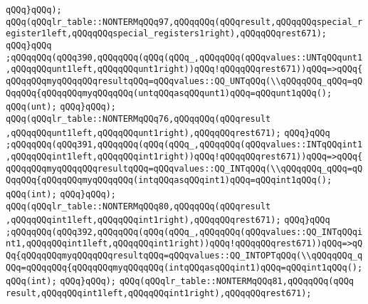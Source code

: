 \verb|qQQq}qQQq);|\newline
\verb|qQQq(qQQqlr_table::NONTERMqQQq97,qQQqqQQq(qQQqresult,qQQqqQQqspecial_register1left,qQQqqQQqspecial_registers1right),qQQqqQQqrest671);|\newline
\verb|qQQq}qQQq|\newline
\verb|;qQQqqQQq(qQQq390,qQQqqQQq(qQQq(qQQq_,qQQqqQQq(qQQqvalues::UNTqQQqunt1,qQQqqQQqunt1left,qQQqqQQqunt1right))qQQq!qQQqqQQqrest671))qQQq=>qQQq{qQQqqQQqmyqQQqqQQqresultqQQq=qQQqvalues::QQ_UNTqQQq(\\qQQqqQQq_qQQq=qQQqqQQq{qQQqqQQqmyqQQqqQQq(untqQQqasqQQqunt1)qQQq=qQQqunt1qQQq();|\newline
\verb|qQQq(unt);|\newline
\verb|qQQq}qQQq);|\newline
\verb|qQQq(qQQqlr_table::NONTERMqQQq76,qQQqqQQq(qQQqresult|\newline
\verb|,qQQqqQQqunt1left,qQQqqQQqunt1right),qQQqqQQqrest671);|\newline
\verb|qQQq}qQQq|\newline
\verb|;qQQqqQQq(qQQq391,qQQqqQQq(qQQq(qQQq_,qQQqqQQq(qQQqvalues::INTqQQqint1,qQQqqQQqint1left,qQQqqQQqint1right))qQQq!qQQqqQQqrest671))qQQq=>qQQq{qQQqqQQqmyqQQqqQQqresultqQQq=qQQqvalues::QQ_INTqQQq(\\qQQqqQQq_qQQq=qQQqqQQq{qQQqqQQqmyqQQqqQQq(intqQQqasqQQqint1)qQQq=qQQqint1qQQq();|\newline
\verb|qQQq(int);|\newline
\verb|qQQq}qQQq);|\newline
\verb|qQQq(qQQqlr_table::NONTERMqQQq80,qQQqqQQq(qQQqresult|\newline
\verb|,qQQqqQQqint1left,qQQqqQQqint1right),qQQqqQQqrest671);|\newline
\verb|qQQq}qQQq|\newline
\verb|;qQQqqQQq(qQQq392,qQQqqQQq(qQQq(qQQq_,qQQqqQQq(qQQqvalues::QQ_INTqQQqint1,qQQqqQQqint1left,qQQqqQQqint1right))qQQq!qQQqqQQqrest671))qQQq=>qQQq{qQQqqQQqmyqQQqqQQqresultqQQq=qQQqvalues::QQ_INTOPTqQQq(\\qQQqqQQq_qQQq=qQQqqQQq{qQQqqQQqmyqQQqqQQq(intqQQqasqQQqint1)qQQq=qQQqint1qQQq();|\newline
\verb|qQQq(int);|\newline
\verb|qQQq}qQQq);|\newline
\verb|qQQq(qQQqlr_table::NONTERMqQQq81,qQQqqQQq(qQQq|\newline
\verb|result,qQQqqQQqint1left,qQQqqQQqint1right),qQQqqQQqrest671);|\newline
